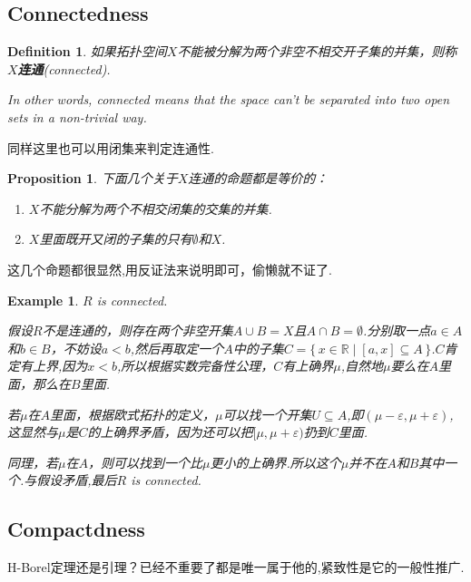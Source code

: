\documentclass{article}
\newtheorem{proposition}[theorem]{Proposition}
\newtheorem{example}[theorem]{Example}
\newtheorem{definition}[theorem]{Definition}
\newcommand\Set[2]{\{\,#1\mid#2\,\}} %
\begin{document}
\newpage
\subsection{Connectedness}

\begin{definition}
如果拓扑空间$X$不能被分解为两个非空不相交开子集的并集，则称$X$\textbf{连通}(connected).

\rm In other words, connected means that the space can’t be separated into two open sets in a non-trivial way.
\end{definition}

同样这里也可以用闭集来判定连通性.

\begin{proposition}
下面几个关于$X$连通的命题都是等价的：
\begin{enumerate}
	\item $X$不能分解为两个不相交闭集的交集的并集.
	\item $X$里面既开又闭的子集的只有$\emptyset$和$X$.
\end{enumerate}
\end{proposition}

这几个命题都很显然,用反证法来说明即可，偷懒就不证了.

\begin{example}
\rm $R$ is connected.

假设$R$不是连通的，则存在两个非空开集$A \cup B = X$且$A \cap B = \emptyset$.分别取一点$a \in A$和$b \in B$，不妨设$a < b$,然后再取定一个$A$中的子集$C=\Set{x \in \mathbb{R}}{[a,x] \subseteq A}$.$C$肯定有上界,因为$x < b$,所以根据实数完备性公理，$C$有上确界$\mu$,自然地$\mu$要么在$A$里面，那么在$B$里面.

若$\mu$在$A$里面，根据欧式拓扑的定义，$\mu$可以找一个开集$U \subseteq A$,即$(\mu-\varepsilon,\mu+\varepsilon)$,这显然与$\mu$是$C$的上确界矛盾，因为还可以把$[\mu,\mu+\varepsilon)$扔到$C$里面.

同理，若$\mu$在$A$，则可以找到一个比$\mu$更小的上确界.所以这个$\mu$并不在$A$和$B$其中一个.与假设矛盾,最后$R$ is connected.
\end{example}



\newpage
\subsection{Compactdness}

\rm H-Borel定理还是引理？已经不重要了都是唯一属于他的,紧致性是它的一般性推广.
\end{document}
